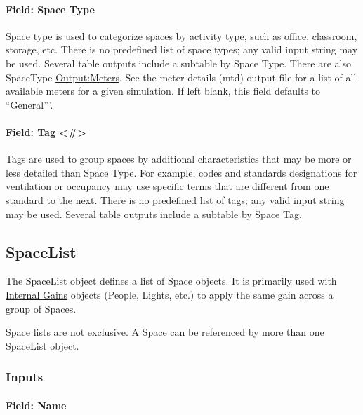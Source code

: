 \paragraph{Field: Space Type}\label{space-type}

Space type is used to categorize spaces by activity type, such as office, classroom, storage, etc. There is no predefined list of space types; 
any valid input string may be used. Several table outputs include a subtable by Space Type. There are also SpaceType \hyperref[outputmeter-and-outputmetermeterfileonly]{Output:Meters}. See the meter details (mtd) output file for a list of all available meters for a given simulation.
If left blank, this field defaults to ``General'''.
 
\paragraph{Field: Tag \textless{}\#\textgreater{}}\label{field-space-tag}

Tags are used to group spaces by additional characteristics that may be more or less detailed than Space Type. For example, codes and standards designations for ventilation or occupancy may use specific terms that are different from one standard to the next. There is no predefined list of tags; 
any valid input string may be used. Several table outputs include a subtable by Space Tag.


\subsection{SpaceList}\label{spacelist}

The SpaceList object defines a list of Space objects. It is primarily used with \hyperref[group-internal-gains-people-lights-other-internal-zone-equipment]{Internal Gains} objects (People, Lights, etc.) to apply the same gain across a group of Spaces.

Space lists are not exclusive. A Space can be referenced by more than one SpaceList object.

\subsubsection{Inputs}\label{inputs-1-045space}

\paragraph{Field: Name}\label{field-space-list-name-000}

